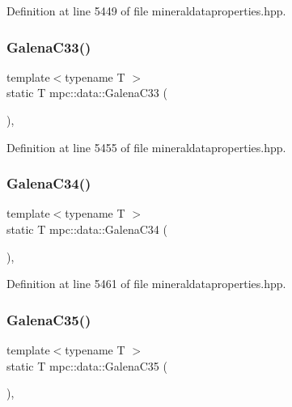 Definition at line 5449 of file mineraldataproperties.\+hpp.

\mbox{\label{namespacempc_1_1data_a4864a297f647e13081c757fe7a9c4de6}} 
\subsubsection{\texorpdfstring{Galena\+C33()}{GalenaC33()}}
{\footnotesize\ttfamily template$<$typename T $>$ \\
static T mpc\+::data\+::\+Galena\+C33 (\begin{DoxyParamCaption}{ }\end{DoxyParamCaption})\hspace{0.3cm}{\ttfamily [inline]}, {\ttfamily [static]}}



Definition at line 5455 of file mineraldataproperties.\+hpp.

\mbox{\label{namespacempc_1_1data_a42a32f7c4c113bee87c4c4312eec8a5e}} 
\subsubsection{\texorpdfstring{Galena\+C34()}{GalenaC34()}}
{\footnotesize\ttfamily template$<$typename T $>$ \\
static T mpc\+::data\+::\+Galena\+C34 (\begin{DoxyParamCaption}{ }\end{DoxyParamCaption})\hspace{0.3cm}{\ttfamily [inline]}, {\ttfamily [static]}}



Definition at line 5461 of file mineraldataproperties.\+hpp.

\mbox{\label{namespacempc_1_1data_aa9e4d430ac4609bb344cdd3d26c67977}} 
\subsubsection{\texorpdfstring{Galena\+C35()}{GalenaC35()}}
{\footnotesize\ttfamily template$<$typename T $>$ \\
static T mpc\+::data\+::\+Galena\+C35 (\begin{DoxyParamCaption}{ }\end{DoxyParamCaption})\hspace{0.3cm}{\ttfamily [inline]}, {\ttfamily [static]}}



